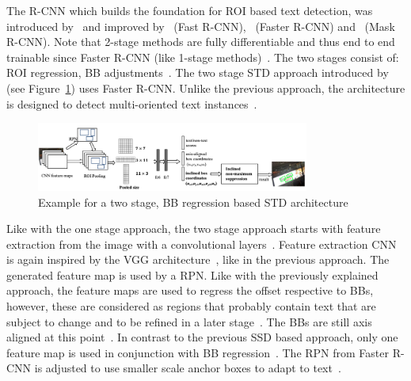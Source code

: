 The R-CNN which builds the foundation for \ac{ROI} based text detection, was introduced
by~\cite{girshick_rich_2014} and improved by~\cite{girshick_fast_2015} (Fast
R-CNN),~\cite{ren_faster_2015} (Faster R-CNN) and~\cite{he_mask_2018} (Mask R-CNN).
Note that 2-stage methods are fully differentiable and thus end to end trainable since
Faster R-CNN (like 1-stage methods)~\citep{ren_faster_2015,long_scene_2021}.
The two stages consist of: \ac{ROI} regression, \ac{BB}
adjustments~\citep{jiang_r2cnn_2017, ren_faster_2015}.
The two stage \ac{STD} approach introduced by~\cite{jiang_r2cnn_2017} (see
Figure~\ref{fig:STD-segfree-rcnn}) uses Faster R-CNN.%
Unlike the previous approach, the architecture is designed to detect multi-oriented text
instances~\citep{jiang_r2cnn_2017,liao_textboxes_2017}.
\begin{figure}[ht]
    \centering
    \includegraphics[width=0.8\textwidth]{img/STD-seg-free-Jiang-R2CNN-2017.png}
    \caption[Two stage, BB regression based STD architecture]{%
        Example for a two stage, BB regression based STD
        architecture~\citep{jiang_r2cnn_2017}\label{fig:STD-segfree-rcnn}
    }
\end{figure}
Like with the one stage approach, the two stage approach starts with feature extraction from the
image with a convolutional layers~\citep{jiang_r2cnn_2017}.
Feature extraction \ac{CNN} is again inspired by the VGG architecture~\citep{jiang_r2cnn_2017},
like in the previous approach.
The generated feature map is used by a \ac{RPN}.
Like with the previously explained approach, the feature maps are used to regress the offset
respective to \acp{BB}, however, these are considered as regions that probably contain text
that are subject to change and to be refined in a later
stage~\citep{jiang_r2cnn_2017,lu_mimicdet_2020}.
The \acp{BB} are still axis aligned at this point~\citep{jiang_r2cnn_2017}.
In contrast to the previous \ac{SSD} based approach, only one feature map is used in conjunction with
\ac{BB} regression~\citep{jiang_r2cnn_2017}.
The \ac{RPN} from Faster R-CNN is adjusted to use smaller scale anchor boxes to adapt to
text~\citep{jiang_r2cnn_2017}.
